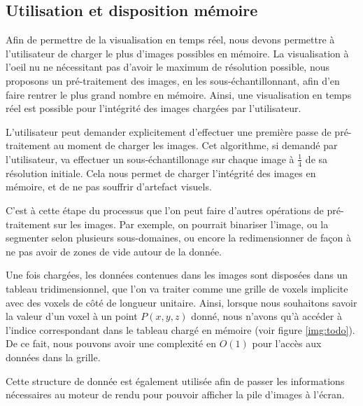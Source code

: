 {{		\subsection{Utilisation et disposition mémoire}
		{
			Afin de permettre de la visualisation en temps réel, nous devons permettre à l'utilisateur de charger le plus d'images possibles en mémoire. La visualisation à l'oeil nu ne nécessitant pas d'avoir le maximum de résolution possible, nous proposons un pré-traitement des images, en les sous-échantillonnant, afin d'en faire rentrer le plus grand nombre en mémoire. Ainsi, une visualisation en temps réel est possible pour l'intégrité des images chargées par l'utilisateur.\par
			L'utilisateur peut demander explicitement d'effectuer une première passe de pré-traitement au moment de charger les images. Cet algorithme, si demandé par l'utilisateur, va effectuer un sous-échantillonage sur chaque image à $\frac{1}{4}$ de sa résolution initiale. Cela nous permet de charger l'intégrité des images en mémoire, et de ne pas souffrir d'artefact visuels.\par

			C'est à cette étape du processus que l'on peut faire d'autres opérations de pré-traitement sur les images. Par exemple, on pourrait binariser l'image, ou la segmenter selon plusieurs sous-domaines, ou encore la redimensionner de façon à ne pas avoir de zones de vide autour de la donnée.

			Une fois chargées, les données contenues dans les images sont disposées dans un tableau tridimensionnel, que l'on va traiter comme une grille de voxels implicite avec des voxels de côté de longueur unitaire. Ainsi, lorsque nous souhaitons savoir la valeur d'un voxel à un point $P(x,y,z)$ donné, nous n'avons qu'à accéder à l'indice correspondant dans le tableau chargé en mémoire (voir figure \ref{img:todo}). De ce fait, nous pouvons avoir une complexité en $O(1)$ pour l'accès aux données dans la grille.\par

			\par

			Cette structure de donnée est également utilisée afin de passer les informations nécessaires au moteur de rendu pour pouvoir afficher la pile d'images à l'écran.\par
		 }
	}\vspace{30pt}\par

}
